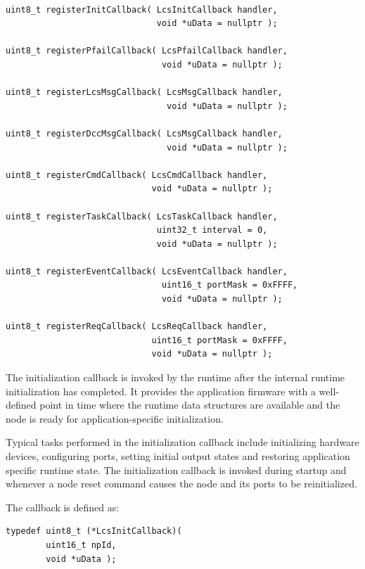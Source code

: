 \begin{lstlisting}[language=RtLib, style=api-interface]

uint8_t registerInitCallback( LcsInitCallback handler,
                              void *uData = nullptr );

uint8_t registerPfailCallback( LcsPfailCallback handler,
                               void *uData = nullptr );

uint8_t registerLcsMsgCallback( LcsMsgCallback handler,
                                void *uData = nullptr );

uint8_t registerDccMsgCallback( LcsMsgCallback handler,
                                void *uData = nullptr );

uint8_t registerCmdCallback( LcsCmdCallback handler,
                             void *uData = nullptr );

uint8_t registerTaskCallback( LcsTaskCallback handler,
                              uint32_t interval = 0,
                              void *uData = nullptr );

uint8_t registerEventCallback( LcsEventCallback handler,
                               uint16_t portMask = 0xFFFF,
                               void *uData = nullptr );

uint8_t registerReqCallback( LcsReqCallback handler,
                             uint16_t portMask = 0xFFFF,
                             void *uData = nullptr );

\end{lstlisting}


The initialization callback is invoked by the runtime after the internal runtime
initialization has completed. It provides the application firmware with a 
well-defined point in time where the runtime data structures are available and 
the node is ready for application-specific initialization.

Typical tasks performed in the initialization callback include initializing hardware
devices, configuring ports, setting initial output states and restoring application
specific runtime state. The initialization callback is invoked during startup 
and whenever a node reset command causes the node and its ports to be reinitialized.

The callback is defined as:

\begin{lstlisting}[style=api-interface]
typedef uint8_t (*LcsInitCallback)(
        uint16_t npId,
        void *uData );
\end{lstlisting}

